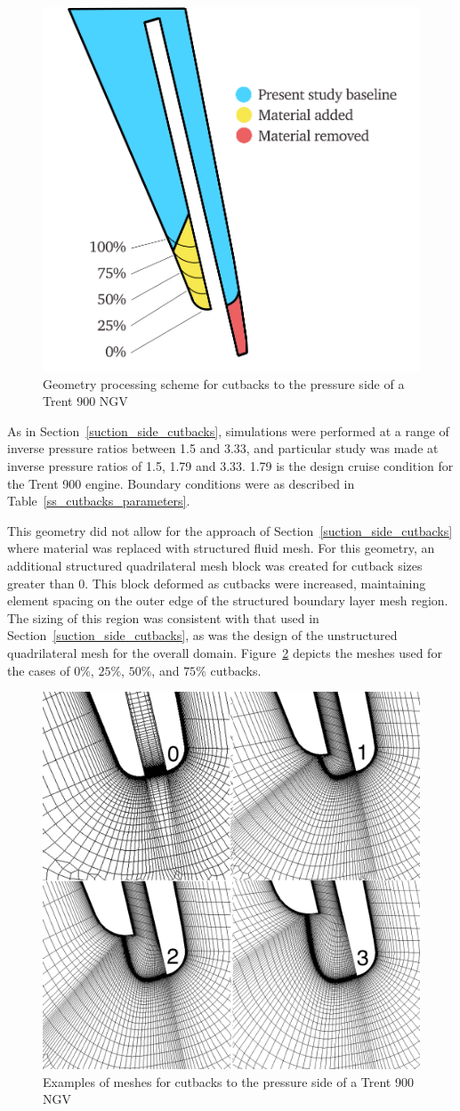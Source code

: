 \documentclass[a4paper, 11pt, oneside]{report}
\begin{document}
\begin{figure}[H]
	\centering
	\includegraphics[width=.60\textwidth]{figs/t900_ps_cutbacks_geometry.png}
	\caption{Geometry processing scheme for cutbacks to the pressure side of a Trent 900 NGV}
    \label{fig:t900_ps_cutbacks_geometry}
\end{figure}

As in Section~\ref{suction_side_cutbacks}, simulations were performed at a range of inverse pressure ratios between 1.5 and 3.33, and particular study was made at inverse pressure ratios of 1.5, 1.79 and 3.33. 1.79 is the design cruise condition for the Trent 900 engine. Boundary conditions were as described in Table~\ref{ss_cutbacks_parameters}.

This geometry did not allow for the approach of Section~\ref{suction_side_cutbacks} where material was replaced with structured fluid mesh. For this geometry, an additional structured quadrilateral mesh block was created for cutback sizes greater than 0. This block deformed as cutbacks were increased, maintaining element spacing on the outer edge of the structured boundary layer mesh region. The sizing of this region was consistent with that used in Section~\ref{suction_side_cutbacks}, as was the design of the unstructured quadrilateral mesh for the overall domain. Figure~\ref{fig:t900_ps_cutbacks_meshes} depicts the meshes used for the cases of $0\%$, $25\%$, $50\%$, and $75\%$ cutbacks.

\begin{figure}[H]
	\centering
	\includegraphics[width=.60\textwidth]{figs/T900_ps_cutbacks_meshes.png}
	\caption{Examples of meshes for cutbacks to the pressure side of a Trent 900 NGV}
    \label{fig:t900_ps_cutbacks_meshes}
\end{figure}
\end{document}
